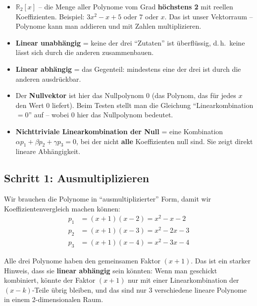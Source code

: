 \documentclass[a4paper,12pt]{article}
\begin{document}
\begin{begriffe}
\begin{itemize}[leftmargin=*, nosep]
    \item $\mathbb{R}_2[x]$ -- die Menge aller Polynome vom Grad \textbf{h\"ochstens 2} mit reellen Koeffizienten. Beispiel: $3x^2 - x + 5$ oder $7$ oder $x$. Das ist unser Vektorraum -- Polynome kann man addieren und mit Zahlen multiplizieren.
    \item \textbf{Linear unabh\"angig} = keine der drei ``Zutaten'' ist \"uberfl\"ussig, d.\,h.\ keine l\"asst sich durch die anderen zusammenbauen.
    \item \textbf{Linear abh\"angig} = das Gegenteil: mindestens eine der drei ist durch die anderen ausdr\"uckbar.
    \item Der \textbf{Nullvektor} ist hier das Nullpolynom $0$ (das Polynom, das f\"ur jedes $x$ den Wert $0$ liefert). Beim Testen stellt man die Gleichung ``Linearkombination $= 0$'' auf -- wobei $0$ hier das Nullpolynom bedeutet.
    \item \textbf{Nichttriviale Linearkombination der Null} = eine Kombination $\alpha p_1 + \beta p_2 + \gamma p_3 = 0$, bei der nicht \textbf{alle} Koeffizienten null sind. Sie zeigt direkt lineare Abh\"angigkeit.
\end{itemize}
\end{begriffe}

\subsection*{Schritt 1: Ausmultiplizieren}

Wir brauchen die Polynome in ``ausmultiplizierter'' Form, damit wir Koeffizientenvergleich machen k\"onnen:
\begin{align*}
p_1 &= (x+1)(x-2) = x^2 - x - 2 \\
p_2 &= (x+1)(x-3) = x^2 - 2x - 3 \\
p_3 &= (x+1)(x-4) = x^2 - 3x - 4
\end{align*}

\begin{merkbox}[title={Trick: Der gemeinsame Faktor}]
Alle drei Polynome haben den gemeinsamen Faktor $(x+1)$. Das ist ein starker Hinweis, dass sie \textbf{linear abh\"angig} sein k\"onnten: Wenn man geschickt kombiniert, k\"onnte der Faktor $(x+1)$ nur mit einer Linearkombination der $(x-k)$-Teile \"ubrig bleiben, und das sind nur 3 verschiedene lineare Polynome in einem 2-dimensionalen Raum.
\end{merkbox}
\end{document}
